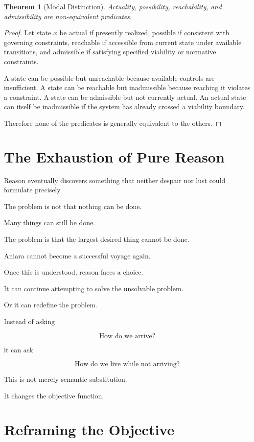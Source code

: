 \documentclass[11pt,oneside]{book}
\newtheorem{theorem}{Theorem}[chapter]
\theoremstyle{definition}
\theoremstyle{remark}
\begin{document}
\begin{theorem}[Modal Distinction]
Actuality, possibility, reachability, and admissibility are non-equivalent predicates.
\end{theorem}

\begin{proof}
Let state \(x\) be actual if presently realized, possible if consistent with governing constraints, reachable if accessible from current state under available transitions, and admissible if satisfying specified viability or normative constraints.

A state can be possible but unreachable because available controls are insufficient. A state can be reachable but inadmissible because reaching it violates a constraint. A state can be admissible but not currently actual. An actual state can itself be inadmissible if the system has already crossed a viability boundary.

Therefore none of the predicates is generally equivalent to the others.
\end{proof}

\section{The Exhaustion of Pure Reason}

Reason eventually discovers something that neither despair nor lust could formulate precisely.

The problem is not that nothing can be done.

Many things can still be done.

The problem is that the largest desired thing cannot be done.

Aniara cannot become a successful voyage again.

Once this is understood, reason faces a choice.

It can continue attempting to solve the unsolvable problem.

Or it can redefine the problem.

Instead of asking

\[
\text{How do we arrive?}
\]

it can ask

\[
\text{How do we live while not arriving?}
\]

This is not merely semantic substitution.

It changes the objective function.

\section{Reframing the Objective}
\end{document}
